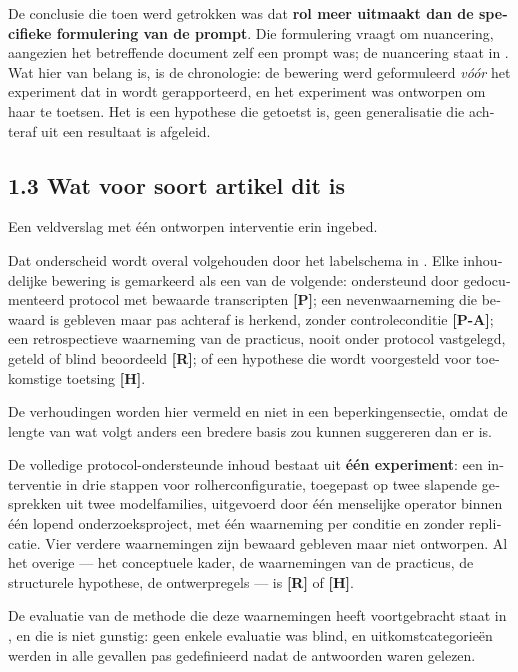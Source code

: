\begin{dutch}
De conclusie die toen werd getrokken was dat \textbf{rol meer uitmaakt dan de specifieke formulering van de prompt}. Die formulering vraagt om nuancering, aangezien het betreffende document zelf een prompt was; de nuancering staat in . Wat hier van belang is, is de chronologie: de bewering werd geformuleerd \emph{vóór} het experiment dat in  wordt gerapporteerd, en het experiment was ontworpen om haar te toetsen. Het is een hypothese die getoetst is, geen generalisatie die achteraf uit een resultaat is afgeleid.


\subsection*{1.3 Wat voor soort artikel dit is}
\label{sec:nl:1.3}

Een veldverslag met één ontworpen interventie erin ingebed.

Dat onderscheid wordt overal volgehouden door het labelschema in . Elke inhoudelijke bewering is gemarkeerd als een van de volgende: ondersteund door gedocumenteerd protocol met bewaarde transcripten \textbf{[P]}; een nevenwaarneming die bewaard is gebleven maar pas achteraf is herkend, zonder controleconditie \textbf{[P-A]}; een retrospectieve waarneming van de practicus, nooit onder protocol vastgelegd, geteld of blind beoordeeld \textbf{[R]}; of een hypothese die wordt voorgesteld voor toekomstige toetsing \textbf{[H]}.

De verhoudingen worden hier vermeld en niet in een beperkingensectie, omdat de lengte van wat volgt anders een bredere basis zou kunnen suggereren dan er is.

De volledige protocol-ondersteunde inhoud bestaat uit \textbf{één experiment}: een interventie in drie stappen voor rolherconfiguratie, toegepast op twee slapende gesprekken uit twee modelfamilies, uitgevoerd door één menselijke operator binnen één lopend onderzoeksproject, met één waarneming per conditie en zonder replicatie. Vier verdere waarnemingen zijn bewaard gebleven maar niet ontworpen. Al het overige — het conceptuele kader, de waarnemingen van de practicus, de structurele hypothese, de ontwerpregels — is \textbf{[R]} of \textbf{[H]}.

De evaluatie van de methode die deze waarnemingen heeft voortgebracht staat in , en die is niet gunstig: geen enkele evaluatie was blind, en uitkomstcategorieën werden in alle gevallen pas gedefinieerd nadat de antwoorden waren gelezen.



\end{dutch}
